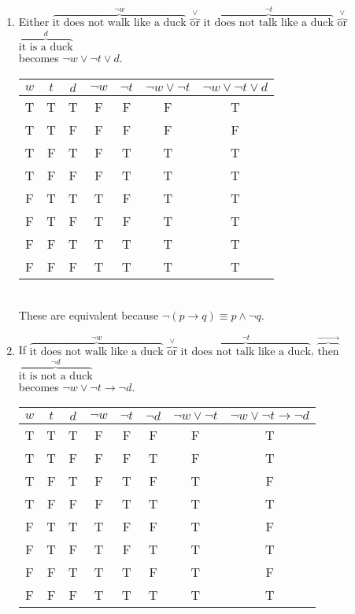 \documentclass[12pt]{article}
\begin{document}
\begin{enumerate}
\begin{enumerate}
  \item Either $\overbrace{\text{it does not walk like a duck}}^{\neg w}$ $\overbrace{\text{or}}^{\vee}$ $\overbrace{\text{it does not talk like a duck}}^{\neg t}$ $\overbrace{\text{or}}^{\vee}$ $\overbrace{\text{it is a duck}}^{d}$ \\becomes $\neg w \vee \neg t \vee d $.\\[\baselineskip]
\begin{tabular} {|c|c|c||c|c|c|c|}
\hline
$w$ & $t$ & $d$  & $\neg w$ & $\neg t$ & $\neg w \vee \neg t$ & $\neg w \vee \neg t \vee d$\\ \hline
T & T & T & F & F & F & T\\
T & T & F & F & F & F & F\\
T & F & T & F & T & T & T\\
T & F & F & F & T & T & T\\
F & T & T & T & F & T & T\\
F & T & F & T & F & T & T\\
F & F & T & T & T & T & T\\
F & F & F & T & T & T & T\\ \hline
\end{tabular}
\\These are equivalent because $\neg(p \rightarrow q) \equiv p \wedge \neg q$.
  \item If $\overbrace{\text{it does not walk like a duck}}^{\neg w}$ $\overbrace{\text{or}}^{\vee}$ $\overbrace{\text{it does not talk like a duck}}^{\neg t}$, $\overbrace{\text{then}}^{\rightarrow}$ $\overbrace{\text{it is not a duck}}^{\neg d}$\\becomes $\neg w \vee \neg t \rightarrow \neg d$.\\[\baselineskip]
\begin{tabular} {|c|c|c||c|c|c|c|c|}
\hline
$w$ & $t$ & $d$  & $\neg w$ & $\neg t$ & $\neg d$ & $\neg w \vee \neg t$ & $\neg w \vee \neg t \rightarrow \neg d$\\ \hline
T & T & T & F & F & F & F & T\\
T & T & F & F & F & T & F & T\\
T & F & T & F & T & F & T & F\\
T & F & F & F & T & T & T & T\\
F & T & T & T & F & F & T & F\\
F & T & F & T & F & T & T & T\\
F & F & T & T & T & F & T & F\\
F & F & F & T & T & T & T & T\\ \hline
\end{tabular}


\end{enumerate}
\end{enumerate}
\end{document}
